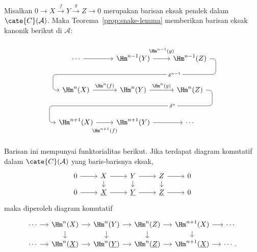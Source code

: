 \begin{proposisi}\label{prop:long-exact-sequence-ses}
	Misalkan $0\to X\xrightarrow{f}Y\xrightarrow{g}Z\to 0$ merupakan barisan
	eksak pendek dalam $\cate{C}(\mathcal{A})$. Maka Teorema~\ref{prop:snake-lemma}
	memberikan barisan eksak kanonik berikut di $\mathcal{A}$:

	\begin{equation*}\begin{tikzcd}[row sep=large]
	\cdots \arrow[r] & \Hm^{n-1}(Y) \arrow[r, "{\Hm^{n-1}(g)}" inner sep=0.7em] \arrow[phantom, d, ""{coordinate, name=A}] & \Hm^{n-1}(Z) \arrow[dll, rounded corners, "{\delta^{n-1}}" description, to path={
		-- ([xshift=2ex]\tikztostart.east)
		|- (A) [near end]\tikztonodes
		-| ([xshift=-2ex]\tikztotarget.west)
		-- (\tikztotarget)}] \\
	\Hm^n(X) \arrow[r, "{\Hm^n(f)}"] & \Hm^n(Y) \arrow[r, "{\Hm^n(g)}"] \arrow[phantom, d, ""{coordinate, name=B}] & \Hm^n(Z) \arrow[dll, rounded corners, "{\delta^n}" description, to path={
		-- ([xshift=2ex]\tikztostart.east)
		|- (B) [near end]\tikztonodes
		-| ([xshift=-2ex]\tikztotarget.west)
		-- (\tikztotarget)}] \\
	\Hm^{n+1}(X) \arrow[r, "{\Hm^{n+1}(f)}"' inner sep=0.7em] & \Hm^{n+1}(Y) \arrow[r] & \cdots
	\end{tikzcd}\end{equation*}

	Barisan ini mempunyai funktorialitas berikut. Jika terdapat diagram
	komutatif dalam $\cate{C}(\mathcal{A})$ yang baris-barisnya eksak,
	\[\begin{tikzcd}[row sep=small]
		0 \arrow[r] & X \arrow[r] \arrow[d] & Y \arrow[r] \arrow[d] & Z \arrow[d] \arrow[r] & 0 \\
		0 \arrow[r] & \underline{X} \arrow[r] & \underline{Y} \arrow[r] & \underline{Z} \arrow[r] & 0
	\end{tikzcd}\]
	maka diperoleh diagram komutatif
	\[\begin{tikzcd}[column sep=small, row sep=small]
		\cdots \arrow[r] & \Hm^n(X) \arrow[d] \arrow[r] & \Hm^n(Y) \arrow[r] \arrow[d] & \Hm^n(Z) \arrow[r] \arrow[d] & \Hm^{n+1}(X) \arrow[r] \arrow[d] & \cdots \\
		\cdots \arrow[r] & \Hm^n(\underline{X}) \arrow[r] & \Hm^n(\underline{Y}) \arrow[r] & \Hm^n(\underline{Z}) \arrow[r] & \Hm^{n+1}(\underline{X}) \arrow[r] & \cdots .
	\end{tikzcd}\]
\end{proposisi}

